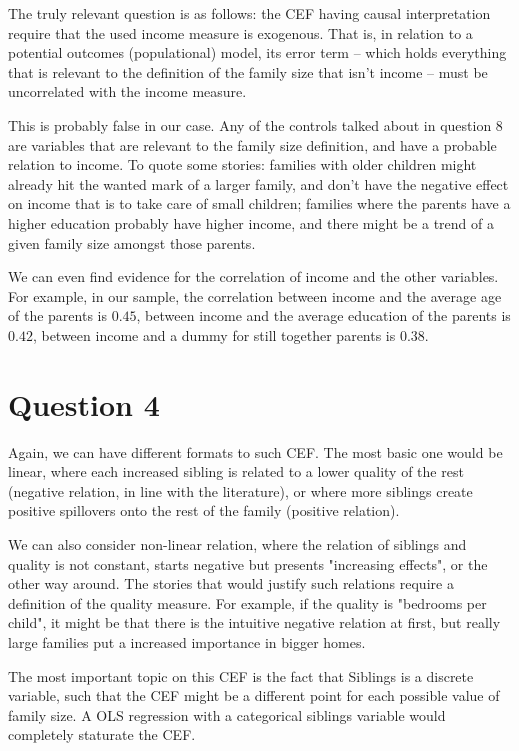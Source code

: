 \documentclass[12pt]{article}
\begin{document}
The truly relevant question is as follows: the CEF having causal interpretation require that the used income measure is exogenous. That is, in relation to a potential outcomes (populational) model, its error term -- which holds everything that is relevant to the definition of the family size that isn't income -- must be uncorrelated with the income measure.

This is probably false in our case. Any of the controls talked about in question 8 are variables that are relevant to the family size definition, and have a probable relation to income. To quote some stories: families with older children might already hit the wanted mark of a larger family, and don't have the negative effect on income that is to take care of small children; families where the parents have a higher education probably have higher income, and there might be a trend of a given family size amongst those parents.

We can even find evidence for the correlation of income and the other variables. For example, in our sample, the correlation between income and the average age of the parents is $0.45$, between income and the average education of the parents is $0.42$, between income and a dummy for still together parents is $0.38$.


\section*{Question 4}
Again, we can have different formats to such CEF. The most basic one would be linear, where each increased sibling is related to a lower quality of the rest (negative relation, in line with the literature), or where more siblings create positive spillovers onto the rest of the family (positive relation).

We can also consider non-linear relation, where the relation of siblings and quality is not constant, starts negative but presents "increasing effects", or the other way around. The stories that would justify such relations require a definition of the quality measure. For example, if the quality is "bedrooms per child", it might be that there is the intuitive negative relation at first, but really large families put a increased importance in bigger homes.

The most important topic on this CEF is the fact that Siblings is a discrete variable, such that the CEF might be a different point for each possible value of family size. A OLS regression with a categorical siblings variable would completely staturate the CEF.
\end{document}
